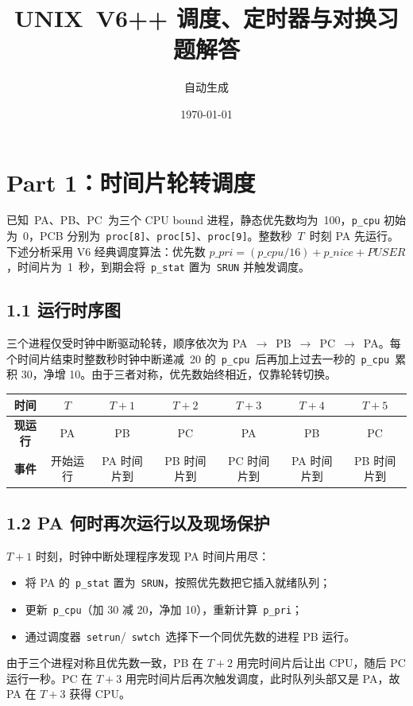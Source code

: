 \documentclass[11pt]{article}
\title{UNIX~V6++ 调度、定时器与对换习题解答}
\author{自动生成}
\date{\today}
\begin{document}
\maketitle

\section*{Part 1：时间片轮转调度}
已知~PA、PB、PC~为三个 CPU bound 进程，静态优先数均为~100，\verb|p_cpu| 初始为~0，PCB 分别为~\verb|proc[8]|、\verb|proc[5]|、\verb|proc[9]|。整数秒~$T$~时刻 PA 先运行。下述分析采用 V6 经典调度算法：优先数 $p\_pri= (p\_cpu/16) + p\_nice + PUSER$，时间片为~1~秒，到期会将~\verb|p_stat| 置为~\verb|SRUN| 并触发调度。

\subsection*{1.1 运行时序图}
三个进程仅受时钟中断驱动轮转，顺序依次为 PA~$\to$~PB~$\to$~PC~$\to$~PA。每个时间片结束时整数秒时钟中断递减~20 的~\verb|p_cpu|~后再加上过去一秒的~\verb|p_cpu|~累积 30，净增 10。由于三者对称，优先数始终相近，仅靠轮转切换。

\begin{center}
\begin{tabular}{>{\bfseries}c|cccccc}
时间 & $T$ & $T{+}1$ & $T{+}2$ & $T{+}3$ & $T{+}4$ & $T{+}5$\\\hline
现运行 & PA & PB & PC & PA & PB & PC\\
事件 & 开始运行 & PA 时间片到 & PB 时间片到 & PC 时间片到 & PA 时间片到 & PB 时间片到\\
\end{tabular}
\end{center}

\subsection*{1.2 PA 何时再次运行以及现场保护}
$T{+}1$ 时刻，时钟中断处理程序发现 PA 时间片用尽：
\begin{itemize}
  \item 将 PA 的~\verb|p_stat| 置为~\verb|SRUN|，按照优先数把它插入就绪队列；
  \item 更新~\verb|p_cpu|（加 30 减 20，净加 10），重新计算~\verb|p_pri|；
  \item 通过调度器~\verb|setrun|/~\verb|swtch|~选择下一个同优先数的进程 PB 运行。
\end{itemize}

由于三个进程对称且优先数一致，PB 在 $T{+}2$ 用完时间片后让出 CPU，随后 PC 运行一秒。PC 在 $T{+}3$ 用完时间片后再次触发调度，此时队列头部又是 PA，故 PA 在 $T{+}3$ 获得 CPU。
\end{document}

